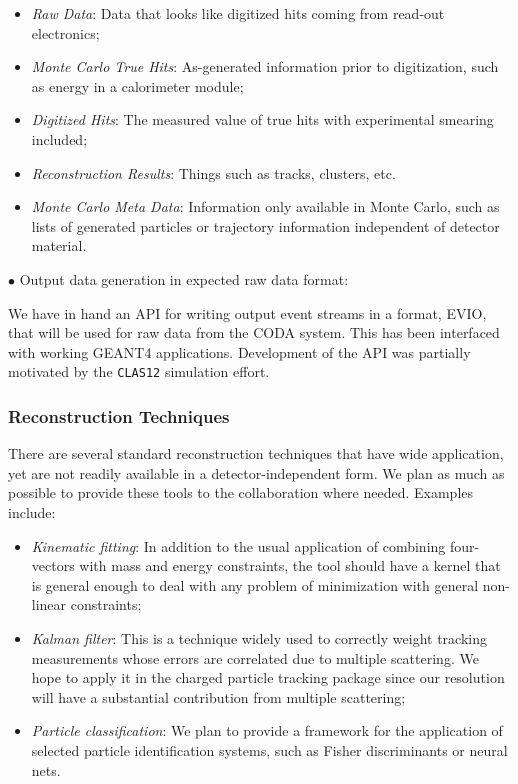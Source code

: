 \documentclass[12pt]{article}
\begin{document}
\begin{itemize}
\item {\it Raw Data}: Data that looks like digitized hits coming from read-out 
electronics;
\item {\it Monte Carlo True Hits}: As-generated information prior to 
digitization, such as energy in a calorimeter module;
\item {\it Digitized Hits}: The measured value of true hits with experimental 
smearing included; 
\item {\it Reconstruction Results}: Things such as tracks, clusters, etc.
\item {\it Monte Carlo Meta Data}: Information only available in Monte Carlo, 
such as lists of generated particles or trajectory information independent 
of detector material.
\end{itemize}

\vskip 0.3cm

\noindent
$\bullet$ Output data generation in expected raw data format:

We have in hand an API for writing output event streams in a format, EVIO, 
that will be used for raw data from the CODA system. This has been interfaced 
with working GEANT4 applications. Development of the API was partially 
motivated by the {\tt CLAS12} simulation effort.

\subsubsection{Reconstruction Techniques}

There are several standard reconstruction techniques that have wide 
application, yet are not readily available in a detector-independent form. 
We plan as much as possible to provide these tools to the collaboration 
where needed. Examples include:

\begin{itemize}
\item {\it Kinematic fitting}: In addition to the usual application of 
combining four-vectors with mass and energy constraints, the tool should 
have a kernel that is general enough to deal with any problem of 
minimization with general non-linear constraints;
\item {\it Kalman filter}: This is a technique widely used to correctly 
weight tracking measurements whose errors are correlated due to multiple 
scattering.  We hope to apply it in the charged particle tracking package 
since our resolution will have a substantial contribution from multiple 
scattering;
\item {\it Particle classification}: We plan to provide a framework for the 
application of selected particle identification systems, such as Fisher 
discriminants or neural nets.
\end{itemize}
\end{document}
